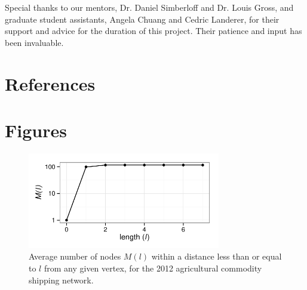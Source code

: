 \documentclass[12pt]{article}
\begin{document}
Special thanks to our mentors, Dr. Daniel Simberloff and Dr. Louis Gross, and graduate student assistants, Angela Chuang and Cedric Landerer, for their support and advice for the duration of this project.  Their patience and input has been invaluable. 

\section*{References}

\section*{Figures}

\begin{figure}[h]
	\centering
	\includegraphics[width=0.75\textwidth]{length_plot.pdf}
	\caption{Average number of nodes $M(l)$ within a distance less than or equal to $l$ from any given vertex, for the 2012 agricultural commodity shipping network.}
	\label{fig:plot length}
\end{figure}
\end{document}
